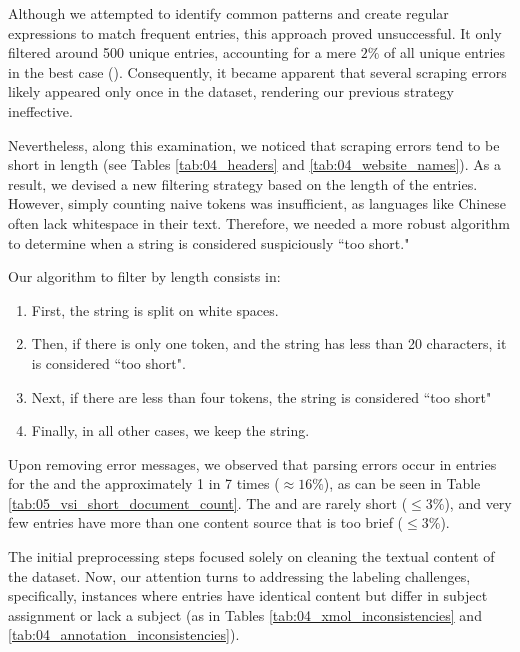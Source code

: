 Although we attempted to identify common patterns and create regular expressions to match frequent entries, this approach proved unsuccessful. It only filtered around 500 unique entries, accounting for a mere $2\%$ of all unique entries in the best case (\trafilaturaAbstract{}). Consequently, it became apparent that several scraping errors likely appeared only once in the dataset, rendering our previous strategy ineffective.

Nevertheless, along this examination, we noticed that scraping errors tend to be short in length (see Tables \ref{tab:04_headers} and \ref{tab:04_website_names}). As a result, we devised a new filtering strategy based on the length of the entries. However, simply counting naive tokens was insufficient, as languages like Chinese often lack whitespace in their text. Therefore, we needed a more robust algorithm to determine when a string is considered suspiciously ``too short."

Our algorithm to filter by length consists in:

\begin{enumerate}
    \item First, the string is split on white spaces.
    \item Then, if there is only one token, and the string has less than 20 characters, it is considered ``too short".
    \item Next, if there are less than four tokens, the string is considered ``too short"
    \item Finally, in all other cases, we keep the string.
\end{enumerate}




Upon removing error messages, we observed that parsing errors occur in entries for the \trafilaturaTitle{} and the \translationTitle{} approximately 1 in 7 times ($\approx 16\% $), as can be seen in Table \ref{tab:05_vsi_short_document_count}. The \trafilaturaAbstract{} and \trafilaturaFulltext{} are rarely short ($\leq 3\% $), and very few entries have more than one content source that is too brief ($\leq 3\% $).


\label{vsi_resolving_inconsistencies}

The initial preprocessing steps focused solely on cleaning the textual content of the dataset. Now, our attention turns to addressing the labeling challenges, specifically, instances where entries have identical content but differ in subject assignment or lack a subject (as in Tables \ref{tab:04_xmol_inconsistencies} and \ref{tab:04_annotation_inconsistencies}).

